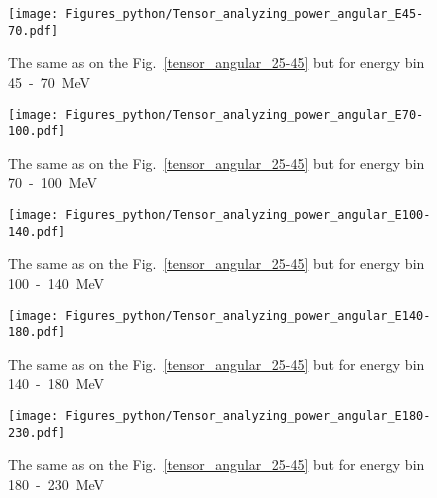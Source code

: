     \begin{figure}[h]
        \begin{center}
        \texttt{[image: Figures\_python/Tensor\_analyzing\_power\_angular\_E45-70.pdf]}
        \end{center}
        \caption{The same as on the Fig.~\ref*{tensor_angular_25-45} but for energy bin 45~-~70~MeV}
        \label{tensor_angular_45-70}
    \end{figure}

    \begin{figure}[h]
        \begin{center}
        \texttt{[image: Figures\_python/Tensor\_analyzing\_power\_angular\_E70-100.pdf]}
        \end{center}
        \caption{The same as on the Fig.~\ref*{tensor_angular_25-45} but for energy bin 70~-~100~MeV}
        \label{tensor_angular_70-100}
    \end{figure}        

    \begin{figure}[h]
        \begin{center}
        \texttt{[image: Figures\_python/Tensor\_analyzing\_power\_angular\_E100-140.pdf]}
        \end{center}
        \caption{The same as on the Fig.~\ref*{tensor_angular_25-45} but for energy bin 100~-~140~MeV}
        \label{tensor_angular_100-140}
    \end{figure}
        
        

    \begin{figure}[h]
        \begin{center}
        \texttt{[image: Figures\_python/Tensor\_analyzing\_power\_angular\_E140-180.pdf]}
        \end{center}
        \caption{The same as on the Fig.~\ref*{tensor_angular_25-45} but for energy bin 140~-~180~MeV}
        \label{tensor_angular_140-180}
    \end{figure}
        

    \begin{figure}[h]
        \begin{center}
        \texttt{[image: Figures\_python/Tensor\_analyzing\_power\_angular\_E180-230.pdf]}
        \end{center}
        \caption{The same as on the Fig.~\ref*{tensor_angular_25-45} but for energy bin 180~-~230~MeV}
        \label{tensor_angular_180-230}
    \end{figure}

